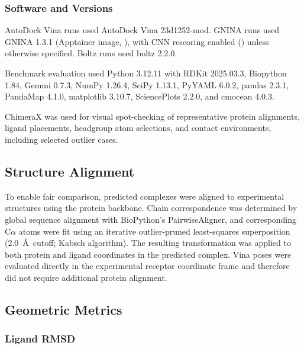\documentclass[journal=jcisd8,manuscript=article]{achemso}
\begin{document}
\subsubsection{Software and Versions}

AutoDock Vina runs used AutoDock Vina 23d1252-mod.
GNINA runs used GNINA 1.3.1 (Apptainer image, ), with CNN rescoring enabled () unless otherwise specified.\cite{mcnutt2025gnina13}
Boltz runs used boltz 2.2.0.
\begin{sloppypar}
Benchmark evaluation used Python 3.12.11 with RDKit 2025.03.3, Biopython 1.84, Gemmi 0.7.3, NumPy 1.26.4, SciPy 1.13.1, PyYAML 6.0.2, pandas 2.3.1, PandaMap 4.1.0, matplotlib 3.10.7, SciencePlots 2.2.0, and cmocean 4.0.3.
\end{sloppypar}
ChimeraX was used for visual spot-checking of representative protein alignments, ligand placements, headgroup atom selections, and contact environments, including selected outlier cases.\cite{goddard2018chimerax}

\subsection{Structure Alignment}

To enable fair comparison, predicted complexes were aligned to experimental structures using the protein backbone.
Chain correspondence was determined by global sequence alignment with BioPython's PairwiseAligner,\cite{cock2009biopython} and corresponding C$\alpha$ atoms were fit using an iterative outlier-pruned least-squares superposition (2.0~\AA\ cutoff; Kabsch algorithm).
The resulting transformation was applied to both protein and ligand coordinates in the predicted complex.
Vina poses were evaluated directly in the experimental receptor coordinate frame and therefore did not require additional protein alignment.

\subsection{Geometric Metrics}

\subsubsection{Ligand RMSD}
\end{document}
